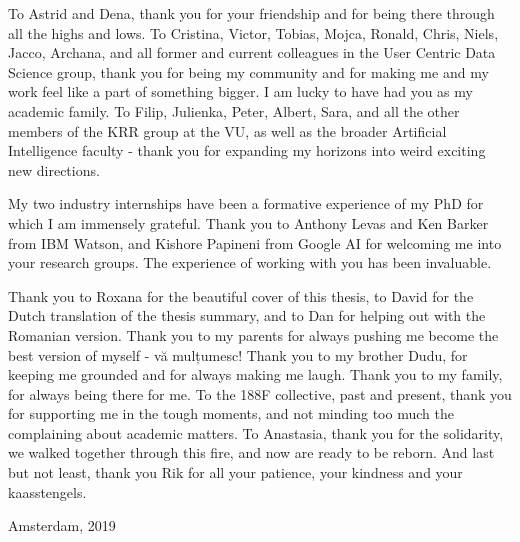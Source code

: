 To Astrid and Dena, thank you for your friendship and for being there through all the highs and lows. To Cristina, Victor, Tobias, Mojca, Ronald, Chris, Niels, Jacco, Archana, and all former and current colleagues in the User Centric Data Science group, thank you for being my community and for making me and my work feel like a part of something bigger. I am lucky to have had you as my academic family. To Filip, Julienka, Peter, Albert, Sara, and all the other members of the KRR group at the VU, as well as the broader Artificial Intelligence faculty - thank you for expanding my horizons into weird exciting new directions.

My two industry internships have been a formative experience of my PhD for which I am immensely grateful. Thank you to Anthony Levas and Ken Barker from IBM Watson, and Kishore Papineni from Google AI for welcoming me into your research groups. The experience of working with you has been invaluable.

Thank you to Roxana for the beautiful cover of this thesis, to David for the Dutch translation of the thesis summary, and to Dan for helping out with the Romanian version. Thank you to my parents for always pushing me become the best version of myself - vă mulțumesc! Thank you to my brother Dudu, for keeping me grounded and for always making me laugh. Thank you to my family, for always being there for me. To the 188F collective, past and present, thank you for supporting me in the tough moments, and not minding too much the complaining about academic matters. To Anastasia, thank you for the solidarity, we walked together through this fire, and now are ready to be reborn. And last but not least, thank you Rik for all your patience, your kindness and your kaasstengels.

\bigskip

\begin{flushright}
Amsterdam, 2019
\end{flushright}

\vfill

\endgroup
